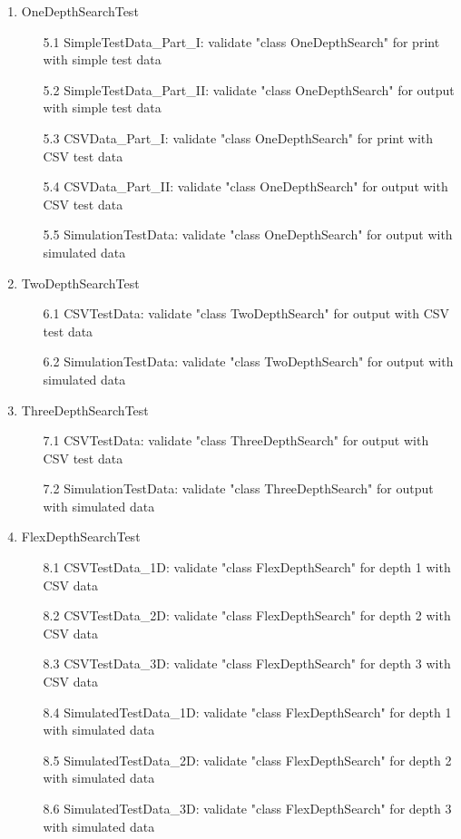 \documentclass{article}
\begin{document}
\begin{enumerate}
\begin{enumerate}
\end{enumerate}
\item OneDepthSearchTest
\begin{enumerate}
\item[5.1] SimpleTestData\_Part\_I: validate "class OneDepthSearch" for print with simple test data
\item[5.2] SimpleTestData\_Part\_II: validate "class OneDepthSearch" for output with simple test data
\item[5.3] CSVData\_Part\_I: validate "class OneDepthSearch" for print with CSV test data
\item[5.4] CSVData\_Part\_II: validate "class OneDepthSearch" for output with CSV test data
\item[5.5] SimulationTestData: validate "class OneDepthSearch" for output with simulated data
\end{enumerate}
\item TwoDepthSearchTest
\begin{itemize}
\item[6.1] CSVTestData: validate "class TwoDepthSearch" for output with CSV test data
\item[6.2] SimulationTestData: validate "class TwoDepthSearch" for output with simulated data
\end{itemize}
\item ThreeDepthSearchTest
\begin{itemize}
\item[7.1] CSVTestData: validate "class ThreeDepthSearch" for output with CSV test data
\item[7.2] SimulationTestData: validate "class ThreeDepthSearch" for output with simulated data
\end{itemize}
\item FlexDepthSearchTest
\begin{enumerate}
\item[8.1] CSVTestData\_1D: validate "class FlexDepthSearch" for depth 1 with CSV data
\item[8.2] CSVTestData\_2D: validate "class FlexDepthSearch" for depth 2 with CSV data
\item[8.3] CSVTestData\_3D: validate "class FlexDepthSearch" for depth 3 with CSV data
\item[8.4] SimulatedTestData\_1D: validate "class FlexDepthSearch" for depth 1 with simulated data
\item[8.5] SimulatedTestData\_2D: validate "class FlexDepthSearch" for depth 2 with simulated data
\item[8.6] SimulatedTestData\_3D: validate "class FlexDepthSearch" for depth 3 with simulated data
\end{enumerate}


\end{enumerate}
\end{document}
